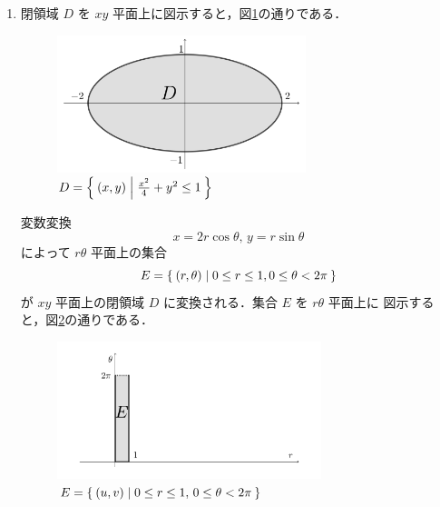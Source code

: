 \documentclass[11pt, uplatex, dvipdfmx]{jsarticle}
\begin{document}
\begin{enumerate}[(1)]
   \item 閉領域 $D$ を $xy$ 平面上に図示すると，図\ref{fig:no10}の通りである．
     \begin{figure}[h]
       \centering
       \includegraphics[height=4cm]{./pictures/no10.pdf}
       \caption{$D=\Set{ (x,y)  |  \frac{x^2}{4} + y^2 \leq 1}$}\label{fig:no10}              
     \end{figure}

     変数変換
     \[
       x=2r\cos \theta, \, y=r\sin \theta
     \]
     によって $r \theta$ 平面上の集合
     \[
       E=\Set{ (r, \theta) | 0 \leq r \leq 1, 0 \leq \theta < 2\pi }
     \]
     が $xy$ 平面上の閉領域 $D$ に変換される．集合 $E$ を $r\theta$ 平面上に
     図示すると，図\ref{fig:no10p}の通りである．
     \begin{figure}[h]
       \centering
       \includegraphics[height=4cm]{./pictures/no10p.pdf}
       \caption{$E=\Set{(u,v) | 0 \leq r \leq 1, \, 0 \leq \theta < 2\pi }$}\label{fig:no10p}       
     \end{figure}


\end{enumerate}
\end{document}

